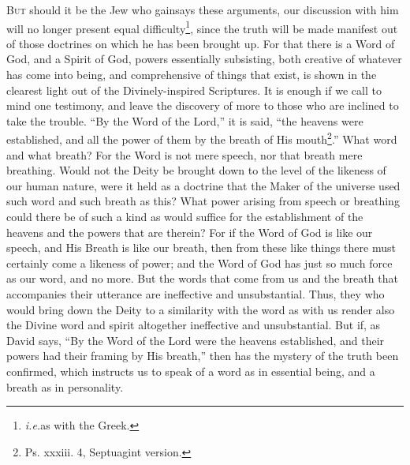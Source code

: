 
\textsc{But} should it be the Jew who gainsays these arguments, our discussion with him will no longer present equal difficulty\footnote{\emph{i.e.}as with the Greek.}, since the truth will be made manifest out of those doctrines on which he has been brought up. For that there is a Word of God, and a Spirit of God, powers essentially subsisting, both creative of whatever has come into being, and comprehensive of things that exist, is shown in the clearest light out of the Divinely-inspired Scriptures. It is enough if we call to mind one testimony, and leave the discovery of more to those who are inclined to take the trouble. “By the Word of the Lord,” it is said, “the heavens were established, and all the power of them by the breath of His mouth\footnote{Ps. xxxiii. 4, Septuagint version.}.” What word and what breath? For the Word is not mere speech, nor that breath mere breathing. Would not the Deity be brought down to the level of the likeness of our human nature, were it held as a doctrine that the Maker of the universe used such word and such breath as this? What power arising from speech or breathing could there be of such a kind as would suffice for the establishment of the heavens and the powers that are therein? For if the Word of God is like our speech, and His Breath is like our breath, then from these like things there must certainly come a likeness of power; and the Word of God has just so much force as our word, and no more. But the words that come from us and the breath that accompanies their utterance are ineffective and unsubstantial. Thus, they who would bring down the Deity to a similarity with the word as with us render also the Divine word and spirit altogether ineffective and unsubstantial. But if, as David says, “By the Word of the Lord were the heavens established, and their powers had their framing by His breath,” then has the mystery of the truth been confirmed, which instructs us to speak of a word as in essential being, and a breath as in personality.


